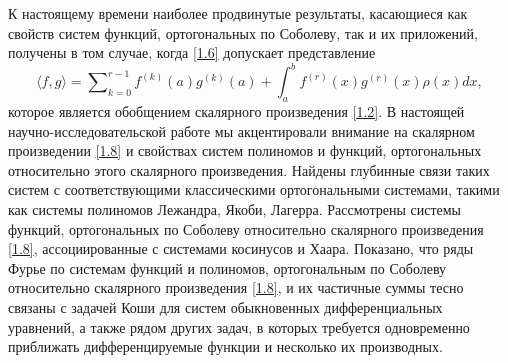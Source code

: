 К настоящему времени наиболее продвинутые результаты, касающиеся как  свойств систем  функций, ортогональных по Соболеву, так и их приложений,  получены в том случае, когда \eqref{1.6} допускает представление
\begin{equation}\label{1.8}
\langle f,g\rangle=\sum\nolimits_{k=0}^{r-1}f^{(k)}(a)g^{(k)}(a)+\int_{a}^{b}f^{(r)}(x)g^{(r)}(x)\rho(x)dx,
\end{equation}
которое является обобщением скалярного произведения \eqref{1.2}. В настоящей научно-исследовательской работе мы акцентировали внимание на скалярном произведении \eqref{1.8} и свойствах систем полиномов и функций, ортогональных относительно этого скалярного произведения. Найдены глубинные связи таких систем с соответствующими классическими ортогональными системами, такими как системы полиномов Лежандра, Якоби, Лагерра. Рассмотрены системы функций, ортогональных по Соболеву относительно скалярного произведения \eqref{1.8}, ассоциированные с системами косинусов и Хаара.  Показано, что  ряды Фурье по системам функций и полиномов, ортогональным по Соболеву относительно скалярного произведения \eqref{1.8}, и их частичные суммы тесно связаны с задачей Коши для систем обыкновенных дифференциальных уравнений, а также рядом других задач, в которых требуется одновременно приближать дифференцируемые функции и несколько их производных.


